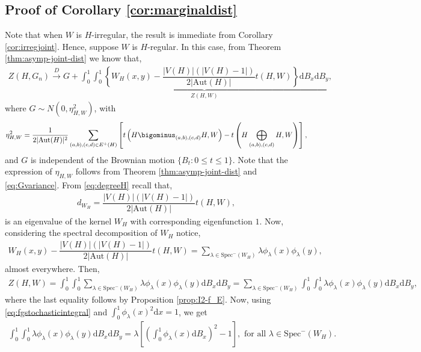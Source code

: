 \documentclass[11pt,reqno]{amsart}
\numberwithin{equation}{section}
\newcommand{\Spec}{\mathrm{Spec}}
\newcommand\Aut{\mathrm{Aut}}
\newcommand\dto{\overset{D}{\rightarrow}}
\theoremstyle{definition}
\begin{document}
\subsection{Proof of Corollary \ref{cor:marginaldist}}

Note that when $W$ is $H$-irregular, the result is immediate from Corollary \ref{cor:irregjoint}. Hence, suppose $W$ is $H$-regular. 
In this case, from Theorem \ref{thm:asymp-joint-dist} we know that,
\begin{align}\label{eq:limitdist1}
    Z(H, G_n)\dto G
    + \underbrace{\int_{0}^{1}\int_{0}^{1} \left\{ W_{H}(x,y) - \dfrac{|V(H)|\left(|V(H)-1|\right)}{2|\mathrm{Aut}(H)|} t(H,W) \right\} \mathrm d B_{x}\mathrm d B_{y}}_{Z(H,W)} , 
\end{align}
where $G\sim N(0,\eta_{H,W}^2)$, with 
\begin{align}\label{eq:exprvarreg}
    \eta_{H,W}^2 = \frac{1}{2|\Aut(H)|^{2}}\sum_{(a,b),(c,d)\in
    E^{+}(H)}\left[t\left(H\bigominus_{(a,b),(c,d)}
    H,W\right)-t\left(H\bigoplus_{(a,b),(c,d)} H,W\right)\right] ,
\end{align}
and $G$ is independent of the Brownian motion $\{B_t:0\leq t\leq 1\}$. Note that the expression of $\eta_{H,W}$ follows from Theorem \ref{thm:asymp-joint-dist} and \eqref{eq:Gvariance}. From \eqref{eq:degreeH} recall that,
\begin{align*}
    d_{W_H} = \dfrac{|V(H)|\left(|V(H)-1|\right)}{2|\mathrm{Aut}(H)|} t(H,W),
\end{align*}
is an eigenvalue of the kernel $W_H$ with corresponding eigenfunction $1$. Now, considering the spectral decomposition of $W_H$ notice,
\begin{align*}
    W_{H}(x,y) - \dfrac{|V(H)|\left(|V(H)-1|\right)}{2|\mathrm{Aut}(H)|} t(H,W) = \sum_{\lambda\in \Spec^{-}(W_H)}\lambda\phi_{\lambda}(x)\phi_{\lambda}(y) , 
\end{align*} 
almost everywhere. 
Then,
\begin{align*}
    Z(H,W) = \int_{0}^{1}\int_{0}^{1} \sum_{\lambda\in \Spec^{-}(W_H)}\lambda\phi_{\lambda}(x)\phi_{\lambda}(y) \mathrm d B_{x}\mathrm d B_{y} = \sum_{\lambda\in \Spec^{-}(W_H)}\int_{0}^{1}\int_{0}^{1}\lambda\phi_{\lambda}(x)\phi_{\lambda}(y) \mathrm d B_{x}\mathrm d B_{y} , 
\end{align*}
where the last equality follows by Proposition \ref{prop:I2-f_E}. Now, using \eqref{eq:fgstochasticintegral} and $\int_{0}^{1}\phi_\lambda(x)^2\mathrm{d}x =1$, we get 
\begin{align*}
    \int_{0}^{1}\int_{0}^{1}\lambda\phi_{\lambda}(x)\phi_{\lambda}(y) \mathrm d B_{x}\mathrm d B_{y} = \lambda\left[\left(\int_{0}^{1}\phi_\lambda(x)\mathrm{d}B_{x}\right)^2-1\right], \text{ for all }\lambda\in \Spec^{-}(W_H).
\end{align*}
\end{document}
